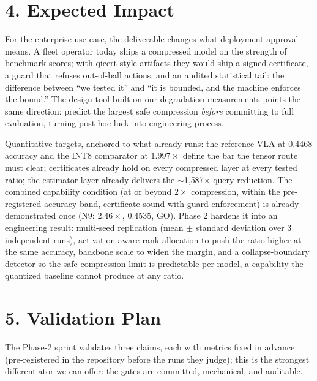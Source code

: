 \documentclass[10pt]{article}
\begin{document}
\section*{4. Expected Impact}
For the enterprise use case, the deliverable changes what deployment approval
means. A fleet operator today ships a compressed model on the strength of
benchmark scores; with qicert-style artifacts they would ship a signed
certificate, a guard that refuses out-of-ball actions, and an audited
statistical tail: the difference between ``we tested it'' and ``it is
bounded, and the machine enforces the bound.'' The design tool built on our
degradation measurements points the same direction: predict the largest safe
compression \emph{before} committing to full evaluation, turning post-hoc
luck into engineering process.

Quantitative targets, anchored to what already runs: the reference VLA at
0.4468 accuracy and the INT8 comparator at $1.997\times$ define the bar the
tensor route must clear; certificates already hold on every compressed layer
at every tested ratio; the estimator layer already delivers the
$\sim$1{,}587$\times$ query reduction. The combined capability condition
(at or beyond $2\times$ compression, within the pre-registered accuracy
band, certificate-sound with guard enforcement) is already demonstrated
once (N9: $2.46\times$, $0.4535$, GO). Phase 2 hardens it into an
engineering result: multi-seed replication (mean $\pm$ standard deviation
over 3 independent runs), activation-aware rank allocation to push the
ratio higher at the same accuracy, backbone scale to widen the margin, and
a collapse-boundary detector so the safe compression limit is predictable
per model, a capability the quantized baseline cannot produce at any
ratio.

\section*{5. Validation Plan}
The Phase-2 sprint validates three claims, each with metrics fixed in advance
(pre-registered in the repository before the runs they judge); this is the
strongest differentiator we can offer: the gates are committed, mechanical,
and auditable.
\end{document}
